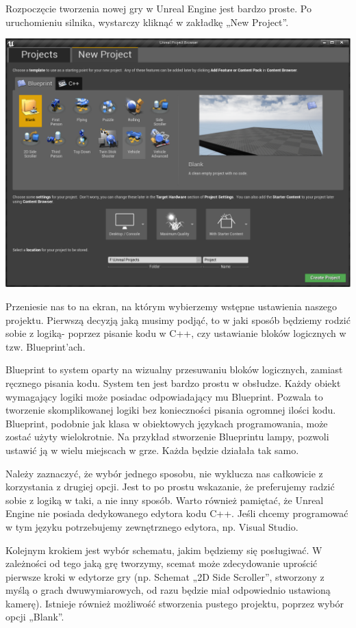 \documentclass[brudnopis]{xmgr}
\begin{document}
Rozpoczęcie tworzenia nowej gry w Unreal Engine jest bardzo proste. Po uruchomieniu silnika, wystarczy kliknąć w zakładkę „New Project”.

\includegraphics[scale=0.25]{Screeny/New_project}

Przeniesie nas to na ekran, na którym wybierzemy wstępne ustawienia naszego projektu. Pierwszą decyzją jaką musimy podjąć, to w jaki sposób będziemy rodzić sobie z logiką- poprzez pisanie kodu w C++, czy ustawianie bloków logicznych w tzw. Blueprint’ach.

Blueprint to system oparty na wizualny przesuwaniu bloków logicznych, zamiast ręcznego pisania kodu. System ten jest bardzo prostu w obsłudze. Każdy obiekt wymagający logiki może posiadac odpowiadający mu Blueprint. Pozwala to tworzenie skomplikowanej logiki bez konieczności pisania ogromnej ilości kodu. Blueprint, podobnie jak klasa w obiektowych językach programowania, może zostać użyty wielokrotnie. Na przykład stworzenie Blueprintu lampy, pozwoli ustawić ją w wielu miejscach w grze. Każda będzie działała tak samo.

Należy zaznaczyć, że wybór jednego sposobu, nie wyklucza nas całkowicie z korzystania z drugiej opcji. Jest to po prostu wskazanie, że preferujemy radzić sobie z logiką w taki, a nie inny sposób.
Warto również pamiętać, że Unreal Engine nie posiada dedykowanego edytora kodu C++. Jeśli chcemy programować w tym języku potrzebujemy zewnętrznego edytora, np. Visual Studio.

Kolejnym krokiem jest wybór schematu, jakim będziemy się posługiwać. W zależności od tego jaką grę tworzymy, scemat może zdecydowanie uprościć pierwsze kroki w edytorze gry (np. Schemat „2D Side Scroller”, stworzony z myślą o grach dwuwymiarowych, od razu będzie miał odpowiednio ustawioną kamerę). Istnieje również możliwość stworzenia pustego projektu, poprzez wybór opcji „Blank”.
\end{document}
